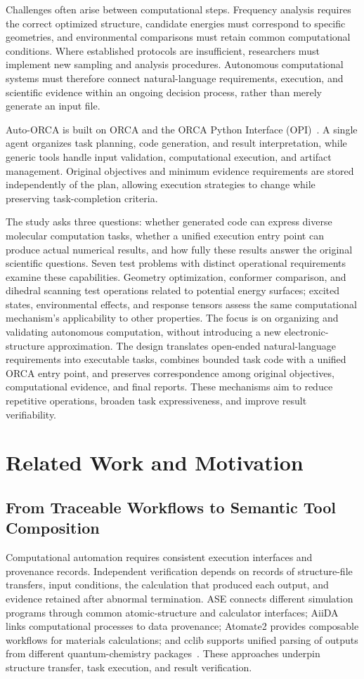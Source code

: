 Challenges often arise between computational steps.
Frequency analysis requires the correct optimized structure, candidate energies must correspond to specific geometries, and environmental comparisons must retain common computational conditions.
Where established protocols are insufficient, researchers must implement new sampling and analysis procedures.
Autonomous computational systems must therefore connect natural-language requirements, execution, and scientific evidence within an ongoing decision process, rather than merely generate an input file.

Auto-ORCA is built on ORCA and the ORCA Python Interface (OPI)~\cite{orca2020,orca6,opipaper}.
A single agent organizes task planning, code generation, and result interpretation, while generic tools handle input validation, computational execution, and artifact management.
Original objectives and minimum evidence requirements are stored independently of the plan, allowing execution strategies to change while preserving task-completion criteria.

The study asks three questions: whether generated code can express diverse molecular computation tasks, whether a unified execution entry point can produce actual numerical results, and how fully these results answer the original scientific questions.
Seven test problems with distinct operational requirements examine these capabilities.
Geometry optimization, conformer comparison, and dihedral scanning test operations related to potential energy surfaces; excited states, environmental effects, and response tensors assess the same computational mechanism's applicability to other properties.
The focus is on organizing and validating autonomous computation, without introducing a new electronic-structure approximation.
The design translates open-ended natural-language requirements into executable tasks, combines bounded task code with a unified ORCA entry point, and preserves correspondence among original objectives, computational evidence, and final reports.
These mechanisms aim to reduce repetitive operations, broaden task expressiveness, and improve result verifiability.

\section{Related Work and Motivation}
\subsection{From Traceable Workflows to Semantic Tool Composition}
Computational automation requires consistent execution interfaces and provenance records.
Independent verification depends on records of structure-file transfers, input conditions, the calculation that produced each output, and evidence retained after abnormal termination.
ASE connects different simulation programs through common atomic-structure and calculator interfaces; AiiDA links computational processes to data provenance; Atomate2 provides composable workflows for materials calculations; and cclib supports unified parsing of outputs from different quantum-chemistry packages~\cite{ase,aiida,atomate2,cclib}.
These approaches underpin structure transfer, task execution, and result verification.

